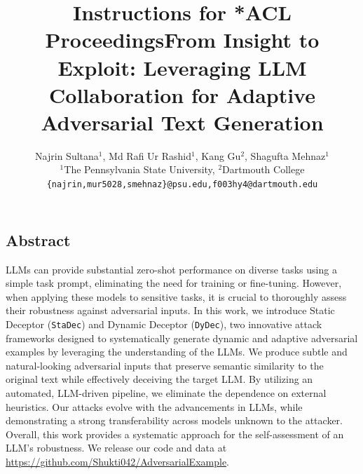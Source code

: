 \documentclass[11pt]{article}
\title{Instructions for *ACL Proceedings}
\newcommand \dydec[0]{\texttt{DyDec}}
\newcommand \stadec[0]{\texttt{StaDec}}
\begin{document}
\date{}


\title{\Large \bf From Insight to Exploit: Leveraging LLM Collaboration for Adaptive Adversarial Text Generation}
\author{
  Najrin Sultana$^{1}$,
  Md Rafi Ur Rashid$^{1}$,
  Kang Gu$^{2}$, Shagufta Mehnaz$^{1}$ \\
  $^{1}$The Pennsylvania State University, 
  $^{2}$Dartmouth College \\
  \texttt{\{najrin,mur5028,smehnaz\}@psu.edu,f003hy4@dartmouth.edu}
}

\maketitle

\thispagestyle{empty}


\subsection*{Abstract}
LLMs can provide substantial zero-shot performance on diverse tasks using a simple task prompt, eliminating the need for training or fine-tuning. However, when applying these models to sensitive tasks, it is crucial to thoroughly assess their robustness against adversarial inputs. In this work, we introduce Static Deceptor (\stadec{}) and Dynamic Deceptor (\dydec{}), two innovative attack frameworks designed to systematically generate dynamic and adaptive adversarial examples by leveraging the understanding of the LLMs. We produce subtle and natural-looking adversarial inputs that preserve semantic similarity to the original text while effectively deceiving the target LLM. By utilizing an automated, LLM-driven pipeline, we eliminate the dependence on external heuristics. Our attacks evolve with the advancements in LLMs, while demonstrating a strong transferability across models unknown to the attacker. Overall, this work provides a systematic approach for the self-assessment of an LLM's robustness. We release our code and data at \url{https://github.com/Shukti042/AdversarialExample}.
\end{document}
